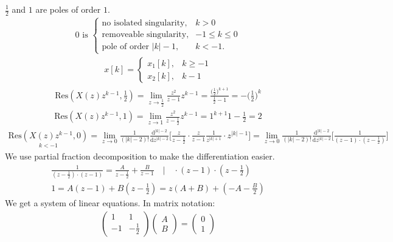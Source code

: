 $\frac{1}{2}$ and $1$ are poles of order $1$.
\begin{align}
	0\text{ is }
	\begin{cases}
		\text{no isolated singularity}, &k>0 \\
		\text{removeable singularity}, &-1\leq k \leq0 \\
		\text{pole of order }|k|-1, &k < -1.
	\end{cases}
\end{align}
\begin{align}
	x[k]=
	\begin{cases}
		x_1[k], &k\geq-1 \\
		x_2[k], &k-1
	\end{cases}
\end{align}
\begin{align}
	\mathrm{Res}(X(z)z^{k-1},\frac{1}{2})=\lim\limits_{z\rightarrow\frac{1}{2}}\frac{z^2}{z-1}z^{k-1}=\frac{\bigg (\frac{1}{2}\bigg)^{k+1}}{\frac{1}{2}-1}=-\bigg (\frac{1}{2}\bigg)^k
\end{align}
\begin{align}
	\mathrm{Res}(X(z)z^{k-1},1)=\lim\limits_{z\rightarrow1}\frac{z^2}{z-\frac{1}{2}}z^{k-1}=1^{k+1}{1-\frac{1}{2}}=2
\end{align}
\begin{align}
	\underset{k<-1}{\mathrm{Res}(X(z)z^{k-1},0)}=\lim\limits_{z\rightarrow0}\frac{1}{(|k|-2)!}\frac{\mathrm{d}^{|k|-2}}{\mathrm{d}z^{|k|-2}}\Bigg [\frac{z}{z-\frac{1}{2}}\cdot\frac{z}{z-1}\frac{1}{z^{|k|+1}}\cdot z^{|k|-1}\Bigg]=\lim\limits_{z\rightarrow0}\frac{1}{(|k|-2)!}\frac{\mathrm{d}^{|k|-2}}{\mathrm{d}z^{|k|-2}}\Bigg [\frac{1}{(z-1)\cdot(z-\frac{1}{2})}\Bigg]
\end{align}
We use partial fraction decomposition to make the differentiation easier.
\begin{align}
	\frac{1}{(z-\frac{1}{2})\cdot(z-1)}=\frac{A}{z-\frac{1}{2}}+\frac{B}{z-1}\quad \Bigg | \quad \cdot(z-1)\cdot(z-\frac{1}{2}) \nonumber \\
	1 = A(z-1)+B(z-\frac{1}{2})=z(A+B)+(-A-\frac{B}{2})
\end{align}
We get a system of linear equations. In matrix notation:
\begin{align}
	\begin{pmatrix}
		1 & 1 \\
		-1 & -\frac{1}{2}
	\end{pmatrix}
	\begin{pmatrix}
		A \\
		B
	\end{pmatrix}
	=
	\begin{pmatrix}
		0 \\
		1
	\end{pmatrix}
\end{align}
